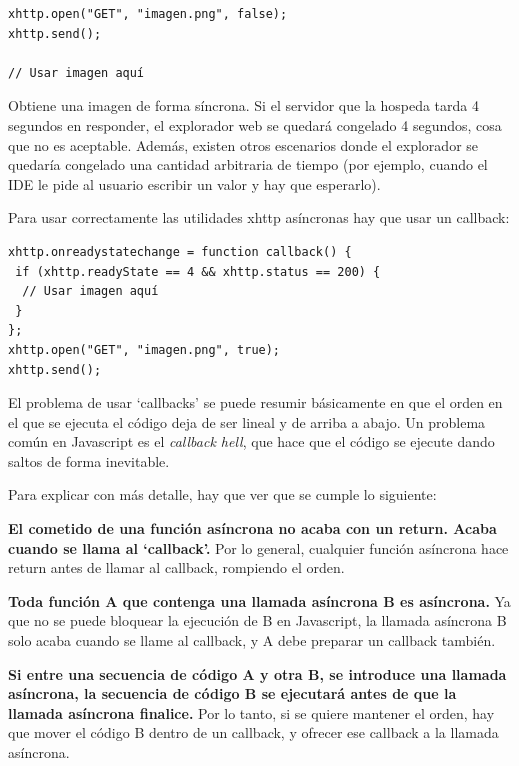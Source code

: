 \documentclass{report}
\begin{document}
\begin{BVerbatim}
xhttp.open("GET", "imagen.png", false);
xhttp.send();

// Usar imagen aquí

\end{BVerbatim}

	Obtiene una imagen de forma síncrona. Si el servidor que la hospeda tarda 4 segundos en responder, el explorador web se quedará congelado 4 segundos, cosa que no es aceptable. Además, existen otros escenarios donde el explorador se quedaría congelado una cantidad arbitraria de tiempo (por ejemplo, cuando el IDE le pide al usuario escribir un valor y hay que esperarlo).
	
	Para usar correctamente las utilidades xhttp asíncronas hay que usar un callback:


\begin{BVerbatim}
xhttp.onreadystatechange = function callback() {
 if (xhttp.readyState == 4 && xhttp.status == 200) {
  // Usar imagen aquí
 }
};
xhttp.open("GET", "imagen.png", true);
xhttp.send();
\end{BVerbatim}

	\vspace{10px}

	El problema de usar `callbacks' se puede resumir básicamente en que el orden en el que se ejecuta el código deja de ser lineal y de arriba a abajo. Un problema común en Javascript es el \textit{callback hell}\cite{callbackhell}, que hace que el código se ejecute dando saltos de forma inevitable. 
	
	Para explicar con más detalle, hay que ver que se cumple lo siguiente:
	
	\vspace{10px}
	
	\noindent
	\textbf{El cometido de una función asíncrona no acaba con un return. Acaba cuando se llama al `callback'.} Por lo general, cualquier función asíncrona hace return antes de llamar al callback, rompiendo el orden.
	
	\vspace{10px}
	
	\noindent
	\textbf{Toda función A que contenga una llamada asíncrona B es asíncrona.} Ya que no se puede bloquear la ejecución de B en Javascript, la llamada asíncrona B solo acaba cuando se llame al callback, y A debe preparar un callback también.
	
	\vspace{10px}
	
	\noindent
	\textbf{Si entre una secuencia de código A y otra B, se introduce una llamada asíncrona, la secuencia de código B se ejecutará antes de que la llamada asíncrona finalice.} Por lo tanto, si se quiere mantener el orden, hay que mover el código B dentro de un callback, y ofrecer ese callback a la llamada asíncrona.
	
\end{document}
